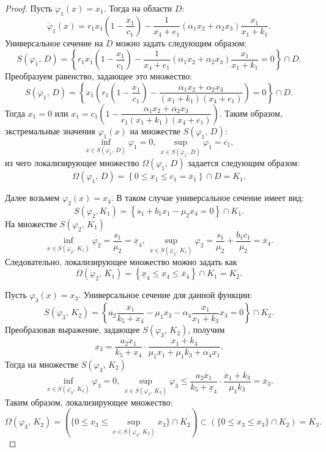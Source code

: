 \documentclass[14pt,a4paper]{extarticle}
\begin{document}
	\begin{proof} 
		Пусть $\varphi_1(x)=x_1$. Тогда на области $D$:
		\[\dot{\varphi}_1(x)=r_1x_1\left(1-\dfrac{x_1}{c_1}\right)-\dfrac{1}{x_4+e_1}(\alpha_1x_2+\alpha_2x_3)\dfrac{x_1}{x_1+k_1}.\]
		Универсальное сечение на $D$ можно задать следующим образом:
		\[S(\varphi_1,\, D)=\left\{r_1x_1\left(1-\dfrac{x_1}{c_1}\right)-\dfrac{1}{x_4+e_1}(\alpha_1x_2+\alpha_2x_3)\dfrac{x_1}{x_1+k_1}=0\right\}\cap D.\]
		Преобразуем равенство, задающее это множество:
		\[S(\varphi_1,\, D)=\left\{x_1\left(r_1\left(1-\dfrac{x_1}{c_1}\right)-\dfrac{\alpha_1x_2+\alpha_2x_3}{(x_1+k_1)(x_4+e_1)}\right)=0\right\}\cap D.\]
		Тогда $x_1=0$ или $x_1=c_1\left(1-\dfrac{\alpha_1x_2+\alpha_2x_3}{r_1(x_1+k_1)(x_4+e_1)}\right) $. Таким образом, экстремальные значения $\varphi_1(x)$ на множестве $S(\varphi_1,\, D)$:
		\[\inf\limits_{x\in S(\varphi_1,\, D)} \varphi_1=0,\, \sup\limits_{x\in S(\varphi_1,\, D)} \varphi_1=c_1,\]
		из чего локализирующее множество $\Omega(\varphi_1,\, D)$ задается следующим образом:
		\[\Omega(\varphi_1,\, D)=\left\{0\leqslant x_1\leqslant c_1 = \overline{x}_1\right\}\cap D=K_1.\]
		
		Далее возьмем $\varphi_2(x)=x_4$. В таком случае универсальное сечение имеет вид:
		\[S(\varphi_2, K_1)=\left\{s_1 + b_1x_1-\mu_2x_4=0\right\}\cap K_1.\]
		На множестве $S(\varphi_2,\, K_1)$
		\[\inf\limits_{x\in S(\varphi_2,\, K_1)} \varphi_2=\dfrac{s_1}{\mu_2} = \underline{x}_4,\, \sup\limits_{x\in S(\varphi_2,\, K_1)} \varphi_2=\dfrac{s_1}{\mu_2}+\dfrac{b_1c_1}{\mu_2} = \overline{x}_4.\]
		Следовательно, локализирующее множество можно задать как 
		\[\Omega(\varphi_2,\, K_1)=\left\{\underline{x}_4 \leqslant x_4\leqslant \overline{x}_4\right\}\cap K_1=K_2.\]
		
		Пусть $\varphi_3(x)=x_3$. Универсальное сечение для данной функции:
		\[S(\varphi_3,\, K_2)=\left\{a_2\dfrac{x_1}{k_5+x_4}-\mu_1x_3-\alpha_4\dfrac{x_1}{x_1+k_3}x_3=0\right\}\cap K_2.\]
		Преобразовав выражение, задающее $S(\varphi_3,\, K_2)$, получим
		\[x_3=\dfrac{a_2x_1}{k_5+x_4}\cdot\dfrac{x_1+k_3}{\mu_1x_1+\mu_1k_3+\alpha_4x_1}.\]
		Тогда на множестве $S(\varphi_3,\, K_2)$
		\[\inf\limits_{x\in S(\varphi_3,\, K_2)} \varphi_3=0,\, \sup\limits_{x\in S(\varphi_3,\, K_2)} \varphi_3\leqslant \dfrac{a_2\overline{x}_1}{k_5+\underline{x}_4}\cdot\dfrac{\overline{x}_1+k_3}{\mu_1k_3}=\overline{x}_3.\]
		Таким образом, локализирующее множество:
		\[\Omega(\varphi_3,\, K_2) = (\{0\leqslant x_3 \leqslant \sup\limits_{x\in S(\varphi_3,\, K_2)} x_3\}\cap K_2) \subset (\{0 \leqslant x_3\leqslant \overline x_3\} \cap K_2) = K_3.\]
		

\end{proof}
\end{document}
